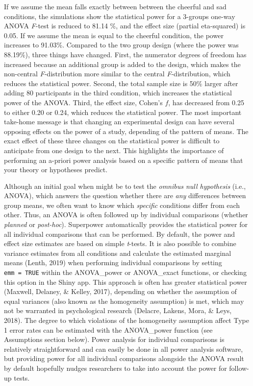 \documentclass[,man,floatsintext]{apa6}
\begin{document}
If we assume the mean falls exactly between between the cheerful and sad conditions, the simulations show the statistical power for a 3-groups one-way ANOVA \emph{F}-test is reduced to 81.14 \%, and the effect size (partial eta-squared) is 0.05.
If we assume the mean is equal to the cheerful condition, the power increases to 91.03\%.
Compared to the two group design (where the power was 88.19\%), three things have changed.
First, the numerator degrees of freedom has increased because an additional group is added to the design, which makes the non-central \emph{F}-distribution more similar to the central \emph{F}-distribution, which reduces the statistical power.
Second, the total sample size is 50\% larger after adding 80 participants in the third condition, which increases the statistical power of the ANOVA.
Third, the effect size, Cohen's \(f\), has decreased from 0.25 to either 0.20 or 0.24, which reduces the statistical power.
The most important take-home message is that changing an experimental design can have several opposing effects on the power of a study, depending of the pattern of means.
The exact effect of these three changes on the statistical power is difficult to anticipate from one design to the next.
This highlights the importance of performing an a-priori power analysis based on a specific pattern of means that your theory or hypotheses predict.

Although an initial goal when might be to test the \emph{omnibus null hypothesis} (i.e., ANOVA), which answers the question whether there are \emph{any} differences between group means, we often want to know which \emph{specific} conditions differ from each other.
Thus, an ANOVA is often followed up by individual comparisons (whether \emph{planned} or \emph{post-hoc}).
Superpower automatically provides the statistical power for all individual comparisons that can be performed.
By default, the power and effect size estimates are based on simple \emph{t}-tests.
It is also possible to combine variance estimates from all conditions and calculate the estimated marginal means (Lenth, 2019) when performing individual comparisons by setting \texttt{emm\ =\ TRUE} within the ANOVA\_power or ANOVA\_exact functions, or checking this option in the Shiny app.
This approach is often has greater statistical power (Maxwell, Delaney, \& Kelley, 2017), depending on whether the assumption of equal variances (also known as the homogeneity assumption) is met, which may not be warranted in psychological research (Delacre, Lakens, Mora, \& Leys, 2018).
The degree to which violations of the homogeneity assumption affect Type 1 error rates can be estimated with the ANOVA\_power function (see Assumptions section below).
Power analysis for individual comparisons is relatively straightforward and can easily be done in all power analysis software, but providing power for all individual comparisons alongside the ANOVA result by default hopefully nudges researchers to take into account the power for follow-up tests.
\end{document}
